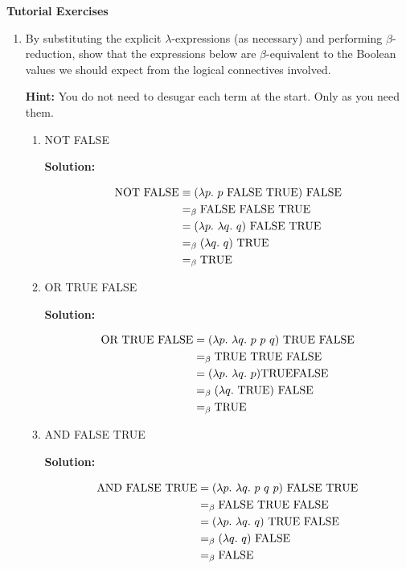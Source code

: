 \documentclass[11pt]{report}
\begin{document}
\newpage
{\bf Tutorial Exercises}
\begin{enumerate}
	
	\item By substituting the explicit $\lambda$-expressions (as necessary) and performing $\beta$-reduction, show that the expressions below are $\beta$-equivalent to the Boolean values we should expect from the logical connectives involved. 
	
	{\bf Hint:} You do not need to desugar each term at the start. Only as you need them. 
	
		\begin{enumerate}
			\item NOT FALSE
			
			{\bf Solution:}

			\begin{align*}
				\NOT \ \FALSE &\equiv (\lambda p. \ p \ \FALSE \ \TRUE) \ \FALSE \\
				&\beq \FALSE \ \FALSE \ \TRUE \\
				&= (\lambda p. \ \lambda q. \ q) \ \FALSE \ \TRUE \\
				&\beq (\lambda q. \ q) \ \TRUE \\
				&\beq \TRUE
			\end{align*}


			\item OR TRUE FALSE 
			
			{\bf Solution:}

			\begin{align*}
				\text{OR} \ \text{TRUE} \ \text{FALSE} &= (\lambda p. \ \lambda q. \ p \ p \ q) \ \text{TRUE} \ \text{FALSE} \\
				&=_{\beta} \text{TRUE} \ \text{TRUE} \ \text{FALSE} \\
				&= (\lambda p. \ \lambda q. \ p) \text{TRUE} \text{FALSE} \\
				&=_{\beta} (\lambda q. \ \text{TRUE}) \ \text{FALSE} \\
				&=_{\beta} \text{TRUE}
			\end{align*}

			\item AND FALSE TRUE 
			
			{\bf Solution:}

			\begin{align*}
				\AND \ \FALSE \ \TRUE &= (\lambda p. \ \lambda q. \ p \ q \ p) \ \FALSE \ \TRUE \\
				&\beq \FALSE \ \TRUE \ \FALSE \\
				&= (\lambda p. \ \lambda q. \ q) \ \TRUE \ \FALSE \\
				&\beq (\lambda q. \ q) \ \FALSE \\
				&\beq \FALSE 
			\end{align*}


\end{enumerate}
\end{enumerate}
\end{document}
